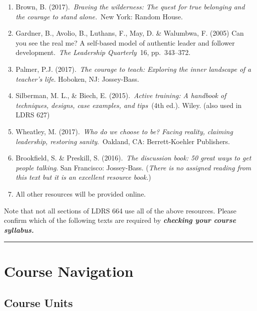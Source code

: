 \documentclass[
]{book}
\begin{document}
\begin{enumerate}
\def\labelenumi{\arabic{enumi}.}
\item
  Brown, B. (2017).~\emph{Braving the wilderness: The quest for true belonging and the courage to stand alone.}~New York: Random House.
\item
  Gardner, B., Avolio, B., Luthans, F., May, D. \& Walumbwa, F. (2005) Can you see the real me? A self-based model of authentic leader and follower development.~\emph{The Leadership Quarterly}~16, pp.~343--372.
\item
  Palmer, P.J. (2017).~\emph{The courage to teach: Exploring the inner landscape of a teacher's life}. Hoboken, NJ: Jossey-Bass.
\item
  Silberman, M. L., \& Biech, E. (2015).~\emph{Active training: A handbook of techniques, designs, case examples, and tips}~(4th ed.). Wiley. (also used in LDRS 627)
\item
  Wheatley, M. (2017).~\emph{Who do we choose to be? Facing reality, claiming leadership, restoring sanity}.~Oakland, CA: Berrett-Koehler Publishers.
\item
  Brookfield, S. \& Preskill, S. (2016).~\emph{The discussion book: 50 great ways to get people talking}. San Francisco: Jossey-Bass. (\emph{There is no assigned reading from this text but it is an excellent resource book.})
\item
  All other resources will be provided online.
\end{enumerate}

\begin{caution}
Note that not all sections of LDRS 664 use all of the above resources.
Please confirm which of the following texts are required by
\textbf{\emph{checking your course syllabus.}}
\end{caution}

\begin{center}\rule{0.5\linewidth}{0.5pt}\end{center}

\hypertarget{course-navigation}{%
\section*{Course Navigation}\label{course-navigation}}

\hypertarget{course-units}{%
\subsection*{Course Units}\label{course-units}}
\end{document}
